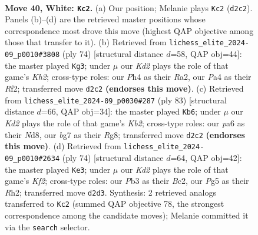 \documentclass[11pt]{article}
\begin{document}
\clearpage

\begin{figure}[p]\centering
\begin{subfigure}{0.46\textwidth}\centering
\resizebox{\linewidth}{!}{%
\newchessgame
\chessboard[
  setfen={2r5/rn3kbp/p2p2p1/4p1P1/PpP1P2P/1P3PBR/3K2B1/R7 w - - 1 40},
  showmover=false,
  pgfstyle=straightmove, color=movearrow, markmove={d2-c2}
]}
\caption{}
\end{subfigure}\hfill
\begin{subfigure}{0.46\textwidth}\centering
\resizebox{\linewidth}{!}{%
\newchessgame
\chessboard[
  setfen={3r4/3bkpp1/1r1p4/2pBpPp1/p3P1P1/2PP3P/RP3R1K/8 w - - 1 38},
  showmover=false,
  pgfstyle=straightmove, color=movearrow, markmove={h2-g3}
]}
\caption{}
\end{subfigure}
\\[4pt]
\begin{subfigure}{0.46\textwidth}\centering
\resizebox{\linewidth}{!}{%
\newchessgame
\chessboard[
  setfen={3n2r1/1k1b1pp1/4p2p/RP1pP2N/2p2PPP/2P5/3K4/3B4 b - - 0 42},
  showmover=false,
  pgfstyle=straightmove, color=movearrow, markmove={b7-b6}
]}
\caption{}
\end{subfigure}\hfill
\begin{subfigure}{0.46\textwidth}\centering
\resizebox{\linewidth}{!}{%
\newchessgame
\chessboard[
  setfen={r7/1r2kp2/p2p2p1/2pPp3/N1P1Pn2/1P3P2/2B2K1R/R7 w - - 5 38},
  showmover=false,
  pgfstyle=straightmove, color=movearrow, markmove={f2-e3}
]}
\caption{}
\end{subfigure}
\caption{\textbf{Move 40, White: \texttt{Kc2}.} (a) Our position; Melanie plays \texttt{Kc2} (\texttt{d2c2}). Panels (b)--(d) are the retrieved master positions whose correspondence most drove this move (highest QAP objective among those that transfer to it). (b) Retrieved from \texttt{lichess\_elite\_2024-09\_p0010\#3808} (ply 74) [structural distance $d$=58, QAP obj=44]: the master played \texttt{Kg3}; under $\mu$ our \emph{Kd2} plays the role of that game's \emph{Kh2}; cross-type roles: our \emph{P}h4 as their \emph{R}a2, our \emph{P}a4 as their \emph{R}f2; transferred move \texttt{d2c2} \textbf{(endorses this move)}. (c) Retrieved from \texttt{lichess\_elite\_2024-09\_p0030\#287} (ply 83) [structural distance $d$=66, QAP obj=34]: the master played \texttt{Kb6}; under $\mu$ our \emph{Kd2} plays the role of that game's \emph{Kb2}; cross-type roles: our \emph{p}a6 as their \emph{N}d8, our \emph{b}g7 as their \emph{R}g8; transferred move \texttt{d2c2} \textbf{(endorses this move)}. (d) Retrieved from \texttt{lichess\_elite\_2024-09\_p0010\#2634} (ply 74) [structural distance $d$=64, QAP obj=42]: the master played \texttt{Ke3}; under $\mu$ our \emph{Kd2} plays the role of that game's \emph{Kf2}; cross-type roles: our \emph{P}b3 as their \emph{B}c2, our \emph{P}g5 as their \emph{R}h2; transferred move \texttt{d2d3}. Synthesis: 2 retrieved analogs transferred to \texttt{Kc2} (summed QAP objective 78, the strongest correspondence among the candidate moves); Melanie committed it via the \texttt{search} selector.}
\label{fig:thought-m78}
\end{figure}
\end{document}
